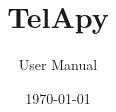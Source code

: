 \documentclass[TelApy]{../../data/TelemacDoc} %
\begin{document}
\let\cleardoublepage\clearpage

\title{TelApy}
\subtitle{User Manual}
\version{\telmaversion}
\date{\today}
\maketitle
\clearpage



\newpage

\thispagestyle{empty}

\TelemacCopyright{}




\pagestyle{empty} %

\tableofcontents%


\pagestyle{fancy} %



%





\end{document}
